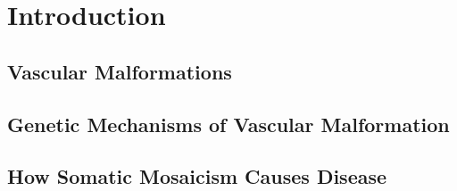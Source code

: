 \chapter{Introduction}
\label{chap:intro}

\clearpage

\section{Vascular Malformations}

\section{Genetic Mechanisms of Vascular Malformation}

\section{How Somatic Mosaicism Causes Disease}
